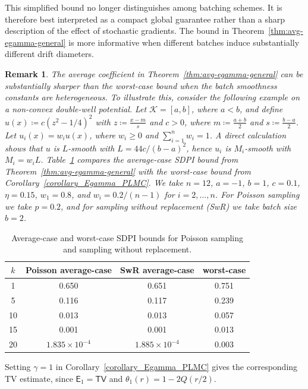 \documentclass[10pt, journal]{IEEEtran}
\newtheorem{remark}{Remark}
\begin{document}
This simplified bound no longer distinguishes among batching schemes. It is therefore best interpreted as a compact global guarantee rather than a sharp description of the effect of stochastic gradients. The bound in Theorem~\ref{thm:avg-egamma-general} is more informative when different batches induce substantially different drift diameters.
\begin{remark}
    The average coefficient in Theorem~\ref{thm:avg-egamma-general} can be substantially sharper than the worst-case bound when the batch smoothness constants are heterogeneous. To illustrate this, consider the following example on a non-convex double-well potential. Let $\mathcal K=[a,b]$, where $a<b$, and define $u(x)\coloneqq c(z^2-1/4)^2$ with $z\coloneqq \frac{x-m}{s}$ and $c>0$, where $m\coloneqq \frac{a+b}{2}$ and $s\coloneqq \frac{b-a}{2}$. Let $u_i(x)=w_i u(x)$, where $w_i\ge0$ and $\sum_{i=1}^n w_i=1$. A direct calculation shows that $u$ is $L$-smooth with $L=44c/(b-a)^2$, hence $u_i$ is $M_i$-smooth with $M_i=w_iL$.
Table~\ref{tab:tv-poisson-swr} compares the average-case SDPI bound from Theorem~\ref{thm:avg-egamma-general} with the worst-case bound from Corollary~\ref{corollary_Egamma_PLMC}. We take $n=12$, $a=-1$, $b=1$, $c=0.1$, $\eta=0.15$, $w_1=0.8$, and $w_i=0.2/(n-1)$ for $i=2,\ldots,n$. For Poisson sampling we take $p=0.2$, and for sampling without replacement (SwR) we take batch size $b=2$.
\end{remark}
\begin{table}[t]
\centering
\caption{Average-case and worst-case SDPI bounds for Poisson sampling and sampling without replacement.}
\label{tab:tv-poisson-swr}
\begin{tabular}{|c|c|c|c|}
\hline
$k$ & Poisson average-case & SwR average-case & worst-case\\
\hline
1  & 0.650 & 0.651 & 0.751 \\
\hline 
5  & 0.116 & 0.117 & 0.239\\
\hline 
10 & 0.013 & 0.013 & 0.057\\
\hline 
15 & 0.001 & 0.001 & 0.013\\
\hline 
20 & $1.835\times 10^{-4}$ & $1.885\times 10^{-4}$ & 0.003 \\
\hline
\end{tabular}
\end{table}








Setting $\gamma=1$ in Corollary~\ref{corollary_Egamma_PLMC} gives the corresponding TV estimate, since $\mathsf E_1=\mathsf{TV}$ and $\theta_1(r)=1-2Q(r/2)$.
\end{document}
